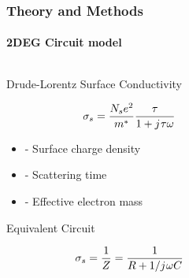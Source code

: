 \documentclass[mathserif,16pt,xcolor=table]{beamer}
\begin{document}
      \begin{frame}
        \frametitle{Theory and Methods}
        \framesubtitle{2DEG Circuit model}
        \begin{columns} %
          \begin{column}{.5\textwidth}
            \begin{minipage}[T][.1\textheight][c]{\linewidth}
              \begin{outline}[itemize]
                \1 Drude-Lorentz Surface Conductivity
              \end{outline}
              \begin{equation} \nonumber
                \sigma_s = \frac{N_s e^2}{m^{\ast}}\frac{\tau}{1 + {j}\mkern1mu \tau \omega}
                \label{eq:Y2deg}
              \end{equation}
              \begin{itemize}
                \item[] { - Surface charge density}
                \item[] {\makebox[.3cm][l]{$\tau$} - Scattering time}
                \item[] { - Effective electron mass}
              \end{itemize}
              \begin{outline}[itemize]
                \1 Equivalent Circuit
                \end{outline}
                \begin{equation} \nonumber
                  \sigma_s = \frac{1}{Z} = \frac{1}{R + {1}/{{j}\mkern1mu \omega C}}
                  \label{eq:simga_TL}
                \end{equation}
            \end{minipage}
          \end{column}
          \begin{column}{.5\textwidth}
            \begin{figure} \vspace*{-1.75cm}

\end{figure}
\end{column}
\end{columns}
\end{frame}
\end{document}
